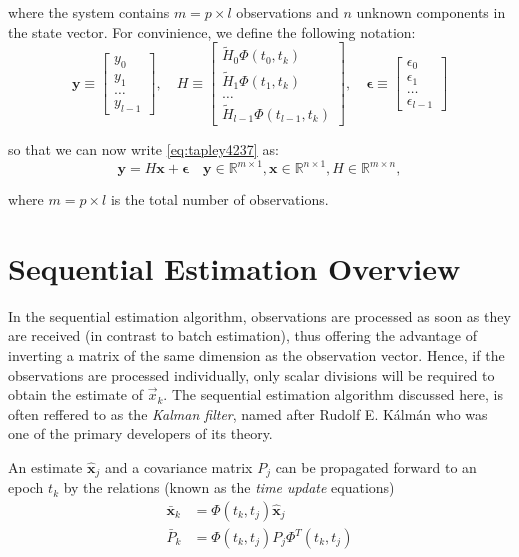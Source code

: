 where the system contains \(m=p\times l\) observations and \(n\) unknown components 
in the state vector. For convinience, we define the following notation:
\begin{equation}
  \bm{y} \equiv \begin{bmatrix} y_0 \\ y_1 \\ \ldots \\ y_{l-1} \end{bmatrix},
  \quad
  H \equiv \begin{bmatrix} \tilde{H}_0 \Phi (t_0, t_k) \\ \tilde{H}_1 \Phi (t_1, t_k) \\ \ldots \\ \tilde{H}_{l-1} \Phi (t_{l-1}, t_k) \end{bmatrix},
  \quad
  \bm{\epsilon} \equiv \begin{bmatrix} {\epsilon}_0 \\ {\epsilon}_1 \\ \ldots \\ {\epsilon}_{l-1} \end{bmatrix}
\end{equation}

so that we can now write \ref{eq:tapley4237} as:
\begin{equation}
  \label{eq:tapley4239}
  \bm{y} = H \bm{x} + \bm{\epsilon} 
  \quad
  \bm{y} \in \mathbb{R} ^{m \times 1},
  \bm{x} \in \mathbb{R} ^{n \times 1},
  H \in \mathbb{R}^{m \times n},
\end{equation}

where \( m = p \times l \) is the total number of observations.

\section{Sequential Estimation Overview}
In the sequential estimation algorithm, observations are processed as soon as they 
are received (in contrast to batch estimation), thus offering the advantage of 
inverting a matrix of the same dimension as the observation vector. Hence, if the 
observations are processed individually, only scalar divisions will be required to 
obtain the estimate of \(\vec{x}_k\). The sequential estimation algorithm discussed 
here, is often reffered to as the \emph{Kalman filter}, named after Rudolf E. K\'alm\'an
who was one of the primary developers of its theory. 

An estimate \(\hat{\bm{x}}_j \) and a covariance matrix \(P_j\) can be 
propagated forward to an epoch \(t_k\) by the relations (known as the 
\emph{time update} equations)
\begin{subequations}
\label{eq:tapley471}
\begin{align}
  \bar{\bm{x}} _k & = \Phi (t_k, t_j) \hat{\bm{x}}_j 
  \label{eq:tapley471a}\\
  \bar{P}_k & = \Phi (t_k, t_j) P_j \Phi ^T (t_k, t_j)
  \label{eq:tapley471b}
\end{align}
\end{subequations}


